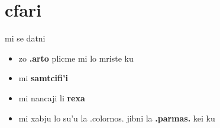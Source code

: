 {    \section{cfari}
    \begin{frame}{mi se datni}
        \begin{itemize}
            \item zo \textbf{.arto} plicme mi lo mriste ku
            \item mi \textbf{samtcifi'i}
            \item mi nancaji li \textbf{rexa}
            \item mi xabju lo su'u la .colornos. jibni la \textbf{.parmas.} kei ku
        \end{itemize}
    \end{frame}
}

